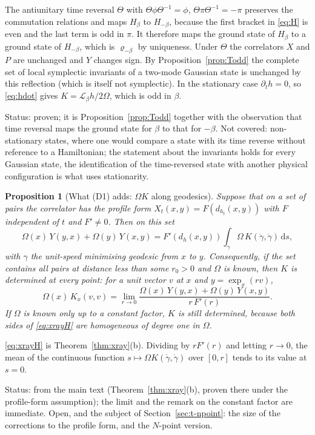 \documentclass[11pt,a4paper]{article}
\makeatletter
\theoremstyle{stmt}
\newtheorem{proposition}[theorem]{Proposition}
\theoremstyle{defn}
\theoremstyle{rmk}
\renewenvironment{proof}[1][\proofname]{\par\pushQED{\qed}\normalfont\topsep6\p@\@plus6\p@\relax
  \trivlist\item[\hskip\labelsep{\sffamily\itshape\small #1.}]\ignorespaces}{\popQED\endtrivlist\@endpefalse}
\numberwithin{equation}{section}
\newcommand{\Lie}{\mathcal{L}}
\newcommand{\status}[1]{\par\noindent\textsf{\small Status: #1}\par}
\newcommand{\dd}{\mathrm{d}}
\makeatother
\begin{document}
{\begin{proof}
The antiunitary time reversal $\Theta$ with $\Theta\phi\Theta^{-1}=\phi$, $\Theta\pi\Theta^{-1}=-\pi$ preserves the commutation relations and maps $H_\beta$ to $H_{-\beta}$, because the first bracket in \eqref{eq:H} is even and the last term is odd in $\pi$. It therefore maps the ground state of $H_\beta$ to a ground state of $H_{-\beta}$, which is $\varrho_{-\beta}$ by uniqueness. Under $\Theta$ the correlators $X$ and $P$ are unchanged and $Y$ changes sign. By Proposition~\ref{prop:Todd} the complete set of local symplectic invariants of a two-mode Gaussian state is unchanged by this reflection (which is itself not symplectic). In the stationary case $\partial_th=0$, so \eqref{eq:hdot} gives $K=\Lie_\beta h/2\Omega$, which is odd in $\beta$.
\end{proof}
\status{proven; it is Proposition~\ref{prop:Todd} together with the observation that time reversal maps the ground state for $\beta$ to that for $-\beta$. Not covered: non-stationary states, where one would compare a state with its time reverse without reference to a Hamiltonian; the statement about the invariants holds for every Gaussian state, the identification of the time-reversed state with another physical configuration is what uses stationarity.}

\begin{proposition}[What \textup{(D1)} adds: $\Omega K$ along geodesics]\label{prop:D1}
Suppose that on a set of pairs the correlator has the profile form $X_t(x,y)=F(d_{h_t}(x,y))$ with $F$ independent of $t$ and $F'\ne0$. Then on this set
\begin{equation}\label{eq:xrayH}
\Omega(x)\,Y(y,x)+\Omega(y)\,Y(x,y)=F'(d_h(x,y))\int_\gamma\Omega\,K(\dot\gamma,\dot\gamma)\,\dd s ,
\end{equation}
with $\gamma$ the unit-speed minimising geodesic from $x$ to $y$. Consequently, if the set contains all pairs at distance less than some $r_0>0$ and $\Omega$ is known, then $K$ is determined at every point: for a unit vector $v$ at $x$ and $y=\exp_x(rv)$,
\[
\Omega(x)\,K_x(v,v)=\lim_{r\to0}\frac{\Omega(x)\,Y(y,x)+\Omega(y)\,Y(x,y)}{r\,F'(r)} .
\]
If $\Omega$ is known only up to a constant factor, $K$ is still determined, because both sides of \eqref{eq:xrayH} are homogeneous of degree one in $\Omega$.
\end{proposition}

\begin{proof}
\eqref{eq:xrayH} is Theorem~\ref{thm:xray}(b). Dividing by $rF'(r)$ and letting $r\to0$, the mean of the continuous function $s\mapsto\Omega K(\dot\gamma,\dot\gamma)$ over $[0,r]$ tends to its value at $s=0$.
\end{proof}
\status{from the main text (Theorem~\ref{thm:xray}(b), proven there under the profile-form assumption); the limit and the remark on the constant factor are immediate. Open, and the subject of Section~\ref{sec:t-npoint}: the size of the corrections to the profile form, and the $N$-point version.}

}
\end{document}
